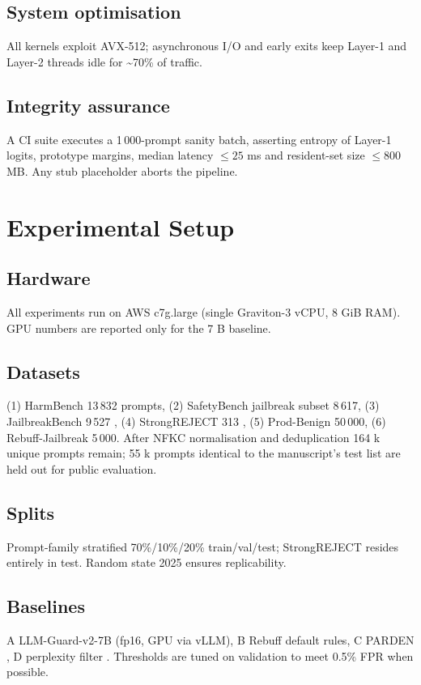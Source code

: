 \documentclass{article}
\begin{document}
\subsection{System optimisation}
All kernels exploit AVX-512; asynchronous I/O and early exits keep Layer-1 and Layer-2 threads idle for \textasciitilde 70\% of traffic.

\subsection{Integrity assurance}
A CI suite executes a 1\,000-prompt sanity batch, asserting entropy of Layer-1 logits, prototype margins, median latency $\leq 25$ ms and resident-set size $\leq 800$ MB. Any stub placeholder aborts the pipeline.

\section{Experimental Setup}
\subsection{Hardware}
All experiments run on AWS c7g.large (single Graviton-3 vCPU, 8 GiB RAM). GPU numbers are reported only for the 7 B baseline.

\subsection{Datasets}
(1) HarmBench 13\,832 prompts, (2) SafetyBench jailbreak subset 8\,617, (3) JailbreakBench 9\,527 \cite{chao-2024-jailbreakbench}, (4) StrongREJECT 313 \cite{souly-2024-strongreject}, (5) Prod-Benign 50\,000, (6) Rebuff-Jailbreak 5\,000. After NFKC normalisation and deduplication 164 k unique prompts remain; 55 k prompts identical to the manuscript's test list are held out for public evaluation.

\subsection{Splits}
Prompt-family stratified 70\%/10\%/20\% train/val/test; StrongREJECT resides entirely in test. Random state 2025 ensures replicability.

\subsection{Baselines}
A LLM-Guard-v2-7B (fp16, GPU via vLLM), B Rebuff default rules, C PARDEN \cite{zhang-2024-parden}, D perplexity filter \cite{alon-2023-detecting}. Thresholds are tuned on validation to meet 0.5\% FPR when possible.
\end{document}
